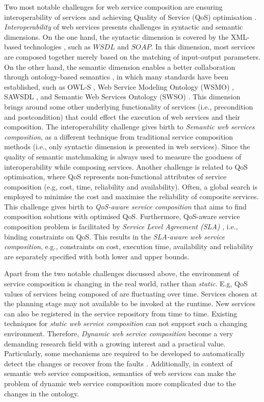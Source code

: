 Two most notable challenges for web service composition are ensuring interoperability of services and achieving Quality of Service (QoS) optimisation \cite{fensel2011semantic}. \emph{Interoperability} of web services presents challenges in syntactic and semantic dimensions. On the one hand, the syntactic dimension is covered by the XML-based technologies \cite{yu2008deploying}, such as $WSDL$ and $SOAP$. In this dimension, most services are composed together merely based on the matching of input-output parameters. On the other hand, the semantic dimension enables a better collaboration through ontology-based semantics \cite{o2005review}, in which many standards have been established, such as OWL-S \cite{martin2004owl}, Web Service Modeling Ontology (WSMO) \cite{lausen2005w3c}, SAWSDL \cite{kopecky2007sawsdl}, and Semantic Web Services Ontology (SWSO) \cite{petrie2016web}. This dimension brings around some other underlying functionality of services (i.e., precondition and postcondition) that could effect the execution of web services and their composition. The interoperability challenge gives birth to \emph{Semantic web services composition}, as a different technique from traditional service composition methods (i.e., only syntactic dimension is presented in web services). Since the quality of semantic matchmaking is always used to measure the goodness of interoperability while composing services. Another challenge is related to QoS optimisation, where QoS represents non-functional attributes of service composition (e.g, cost, time, reliability and availability). Often, a global search is employed to minimise the cost and maximise the reliability of composite services. This challenge gives birth to \emph{QoS-aware service composition} that aims to find composition solutions with optimised QoS. Furthermore, QoS-aware service composition problem is facilitated by \emph{Service Level Agreement (SLA)} \cite{sahai2002automated}, i.e., binding constraints on QoS. This results in the \emph{SLA-aware web service composition}, e.g., constraints on cost, execution time, availability and reliability are separately specified with both lower and upper bounds.

Apart from the two notable challenges discussed above, the environment of service composition is changing in the real world, rather than \emph{static}. E.g, QoS values of services being composed of are fluctuating over time. Services chosen at the planning stage may not available to be invoked at the runtime. New services can also be registered in the service repository from time to time. Existing techniques for \emph{static web service composition} can not support such a changing environment. Therefore, \emph{Dynamic web service composition} become a very demanding research field with a growing interest and a practical value. Particularly, some mechanisms are required to be developed to automatically detect the changes or recover from the faults \cite{chan2009fault}. Additionally, in context of semantic web service composition, semantics of web services can make the problem of dynamic web service composition more complicated due to the changes in the ontology.


